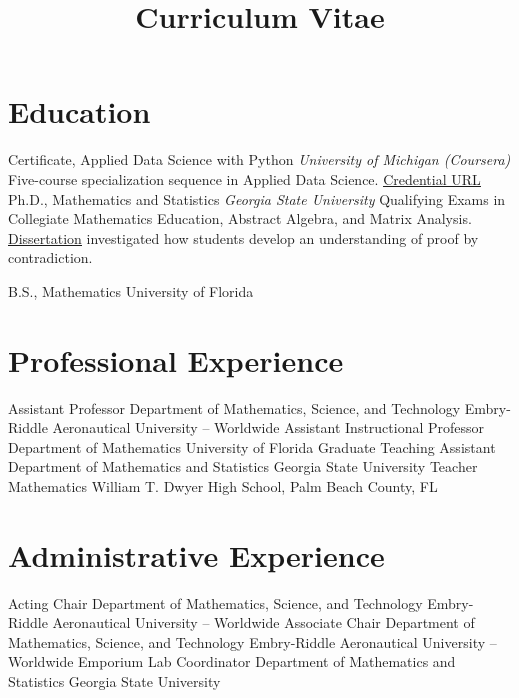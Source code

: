 \documentclass[10pt,a4paper,sans]{moderncv}
\title{Curriculum Vitae}
\begin{document}
\makecvtitle
\vspace*{-1cm}
\section{Education}
{Certificate, Applied Data Science with Python}
{}{}
{\textit{University of Michigan (Coursera)}}
{ Five-course specialization sequence in Applied Data Science. 
	\href{https://www.coursera.org/account/accomplishments/specialization/certificate/7TEVNZ89JDDA}{\underline{Credential URL}}  
}
{}
	{Ph.D., Mathematics and Statistics}
	{}{}
	{\textit{Georgia State University}}
	{Qualifying Exams in Collegiate Mathematics Education, Abstract Algebra, and Matrix Analysis. \\ 
	\href{https://scholarworks.gsu.edu/math_diss/46/}{\underline{Dissertation}} investigated how students develop an understanding of proof by contradiction. 
	}
	{}
	
	{B.S., Mathematics}
	{University of Florida}
	{}{}{}
\section{Professional Experience}
	{Assistant Professor}
	{}
	{Department of Mathematics, Science, and Technology}
	{Embry-Riddle Aeronautical University -- Worldwide}
	{}
	{Assistant Instructional Professor}
	{}
	{Department of Mathematics}
	{University of Florida}
	{}
	{Graduate Teaching Assistant}
	{}
	{Department of Mathematics and Statistics}
	{Georgia State University}
	{}
	{Teacher}
	{}
	{Mathematics}
	{William T. Dwyer High School, Palm Beach County, FL}
	{} 
\section{Administrative Experience}
	{Acting Chair}
	{}
	{Department of Mathematics, Science, and Technology}
	{Embry-Riddle Aeronautical University -- Worldwide}
	{}
	{Associate Chair}
	{}
	{Department of Mathematics, Science, and Technology}
	{Embry-Riddle Aeronautical University -- Worldwide}
	{}
	{Emporium Lab Coordinator}
	{}
	{Department of Mathematics and Statistics}
	{Georgia State University}
	{}
\end{document}
